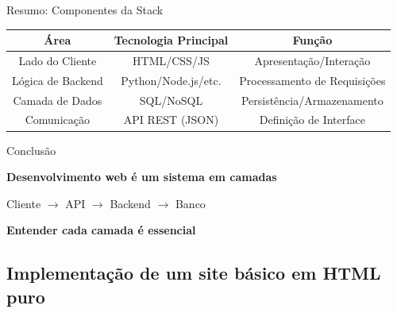 \documentclass{beamer}
\begin{document}
\begin{frame}{Resumo: Componentes da Stack}
    \begin{table}
        \centering
        \begin{tabular}{|c|c|c|}
            \hline
            \textbf{Área} & \textbf{Tecnologia Principal} & \textbf{Função} \\
            \hline
            Lado do Cliente & HTML/CSS/JS & Apresentação/Interação \\
            \hline
            Lógica de Backend & Python/Node.js/etc. & Processamento de Requisições \\
            \hline
            Camada de Dados & SQL/NoSQL & Persistência/Armazenamento \\
            \hline
            Comunicação & API REST (JSON) & Definição de Interface \\
            \hline
        \end{tabular}
    \end{table}
\end{frame}

\begin{frame}{Conclusão}

\centering
\textbf{Desenvolvimento web é um sistema em camadas}

\vspace{0.5cm}

Cliente $\rightarrow$ API $\rightarrow$ Backend $\rightarrow$ Banco

\vspace{1cm}

\textbf{Entender cada camada é essencial}

\end{frame}

\subsection{Implementação de um site básico em HTML puro}
\end{document}
